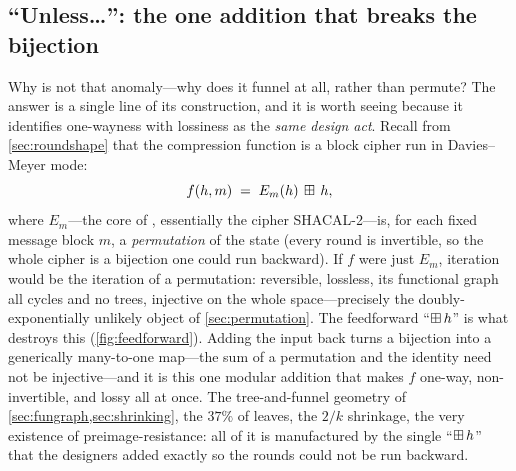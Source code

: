 \subsection{``Unless\dots'': the one addition that breaks the bijection}
\label{sec:unless}

Why is \SHA{} not that anomaly---why does it funnel at all, rather than
permute? The answer is a single line of its construction, and it is worth
seeing because it identifies one-wayness with lossiness as the \emph{same
design act}. Recall from \cref{sec:roundshape} that the compression
function is a block cipher run in Davies--Meyer mode:
\[
  f(h, m) \;=\; E_{m}(h) \,\boxplus\, h,
\]
where $E_{m}$---the core of \SHA{}, essentially the cipher SHACAL-2---is,
for each fixed message block $m$, a \emph{permutation} of the state
(every round is invertible, so the whole cipher is a bijection one could
run backward). If $f$ were just $E_{m}$, iteration would be the iteration
of a permutation: reversible, lossless, its functional graph all cycles
and no trees, injective on the whole space---precisely the
doubly-exponentially unlikely object of \cref{sec:permutation}. The
feedforward ``$\boxplus\,h$'' is what destroys this
(\cref{fig:feedforward}). Adding the input back turns a bijection into a
generically many-to-one map---the sum of a permutation and the identity
need not be injective---and it is this one modular addition that makes
$f$ one-way, non-invertible, and lossy all at once. The tree-and-funnel
geometry of \cref{sec:fungraph,sec:shrinking}, the $37\%$ of leaves, the
$2/k$ shrinkage, the very existence of preimage-resistance: all of it is
manufactured by the single ``$\boxplus\,h$'' that the designers added
exactly so the rounds could not be run backward.

